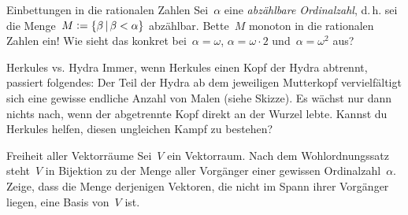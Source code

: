 \documentclass{uebblatt}
\begin{document}
\begin{aufgabe}{Einbettungen in die rationalen Zahlen}
Sei~$\alpha$ eine \emph{abzählbare Ordinalzahl}, d.\,h. sei die Menge~$M \vcentcolon=
\{ \beta \,|\, \beta < \alpha \}$ abzählbar. Bette~$M$ monoton in die
rationalen Zahlen ein! Wie sieht das konkret bei~$\alpha = \omega$, $\alpha =
\omega \cdot 2$ und~$\alpha = \omega^2$ aus?
\end{aufgabe}

\begin{aufgabe}{Herkules vs. Hydra}
Immer, wenn Herkules einen Kopf der Hydra abtrennt, passiert folgendes: Der
Teil der Hydra ab dem jeweiligen Mutterkopf vervielfältigt sich eine gewisse
endliche Anzahl von Malen (siehe Skizze). Es wächst nur dann nichts nach, wenn
der abgetrennte Kopf direkt an der Wurzel lebte. Kannst du Herkules helfen,
diesen ungleichen Kampf zu bestehen?
\end{aufgabe}

\begin{aufgabe}{Freiheit aller Vektorräume}
Sei~$V$ ein Vektorraum. Nach dem Wohlordnungssatz steht~$V$ in Bijektion zu der
Menge aller Vorgänger einer gewissen Ordinalzahl~$\alpha$. Zeige, dass die
Menge derjenigen Vektoren, die nicht im Spann ihrer Vorgänger liegen, eine
Basis von~$V$ ist.
\end{aufgabe}

\end{document}
